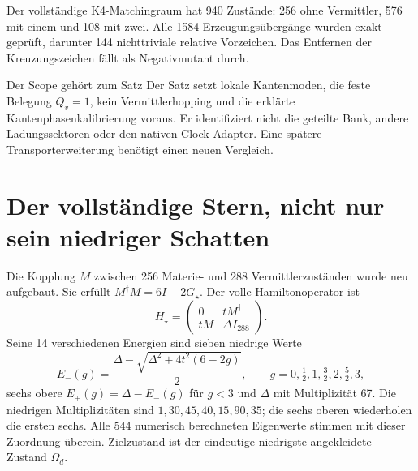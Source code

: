 Der vollständige K4-Matchingraum hat 940 Zustände: 256 ohne Vermittler, 576 mit einem und 108 mit zwei. Alle 1584 Erzeugungsübergänge wurden exakt geprüft, darunter 144 nichttriviale relative Vorzeichen. Das Entfernen der Kreuzungszeichen fällt als Negativmutant durch.

\begin{grenze}{Der Scope gehört zum Satz}
Der Satz setzt lokale Kantenmoden, die feste Belegung $Q_v=1$, kein Vermittlerhopping und die erklärte Kantenphasenkalibrierung voraus. Er identifiziert nicht die geteilte Bank, andere Ladungssektoren oder den nativen Clock-Adapter. Eine spätere Transporterweiterung benötigt einen neuen Vergleich.
\end{grenze}

\section{Der vollständige Stern, nicht nur sein niedriger Schatten}
Die Kopplung $M$ zwischen 256 Materie- und 288 Vermittlerzuständen wurde neu aufgebaut. Sie erfüllt $M^\dagger M=6I-2G_\star$. Der volle Hamiltonoperator ist
\begin{equation}
H_\star=\begin{pmatrix}0&tM^\dagger\\tM&\Delta I_{288}\end{pmatrix}.
\end{equation}
Seine 14 verschiedenen Energien sind sieben niedrige Werte
\begin{equation}
E_-(g)=\frac{\Delta-\sqrt{\Delta^2+4t^2(6-2g)}}2,
\qquad g=0,\tfrac12,1,\tfrac32,2,\tfrac52,3,
\end{equation}
sechs obere $E_+(g)=\Delta-E_-(g)$ für $g<3$ und $\Delta$ mit Multiplizität 67. Die niedrigen Multiplizitäten sind $1,30,45,40,15,90,35$; die sechs oberen wiederholen die ersten sechs. Alle 544 numerisch berechneten Eigenwerte stimmen mit dieser Zuordnung überein. Zielzustand ist der eindeutige niedrigste angekleidete Zustand $\Omega_d$.

